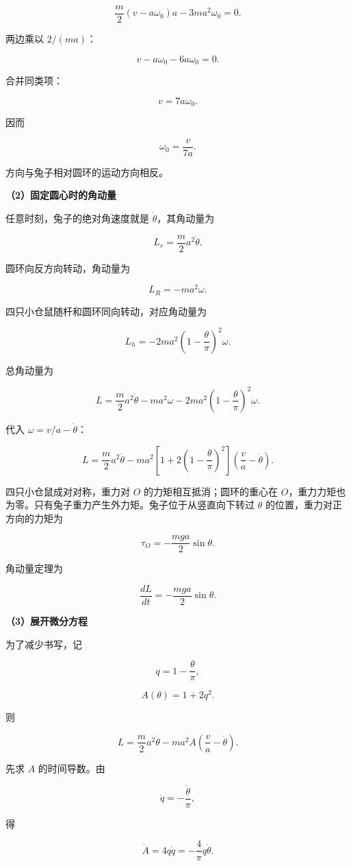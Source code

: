 \documentclass[12pt,a4paper,UTF8]{ctexart}
\begin{document}
\[\frac m2(v-a\omega_0)a-3ma^2\omega_0=0.\]

两边乘以 \(2/(ma)\)：

\[v-a\omega_0-6a\omega_0=0.\]

合并同类项：

\[v=7a\omega_0.\]

因而

\[\boxed{\omega_0=\frac{v}{7a}}.\]

方向与兔子相对圆环的运动方向相反。

\textbf{（2）固定圆心时的角动量}

任意时刻，兔子的绝对角速度就是 \(\dot\theta\)，其角动量为

\[L_r=\frac m2a^2\dot\theta.\]

圆环向反方向转动，角动量为

\[L_R=-ma^2\omega.\]

四只小仓鼠随杆和圆环同向转动，对应角动量为

\[L_h=-2ma^2\left(1-\frac\theta\pi\right)^2\omega.\]

总角动量为

\[L=\frac m2a^2\dot\theta
-ma^2\omega
-2ma^2\left(1-\frac\theta\pi\right)^2\omega.\]

代入 \(\omega=v/a-\dot\theta\)：

\[L=\frac m2a^2\dot\theta
-ma^2\left[1+2\left(1-\frac\theta\pi\right)^2\right]
\left(\frac va-\dot\theta\right).\]

四只小仓鼠成对对称，重力对 \(O\) 的力矩相互抵消；圆环的重心在
\(O\)，重力力矩也为零。只有兔子重力产生外力矩。兔子位于从竖直向下转过
\(\theta\) 的位置，重力对正方向的力矩为

\[\tau_O=-\frac{mga}{2}\sin\theta.\]

角动量定理为

\[\frac{dL}{dt}=-\frac{mga}{2}\sin\theta.\]

\textbf{（3）展开微分方程}

为了减少书写，记

\[q=1-\frac\theta\pi,\]

\[A(\theta)=1+2q^2.\]

则

\[L=\frac m2a^2\dot\theta-ma^2A
\left(\frac va-\dot\theta\right).\]

先求 \(A\) 的时间导数。由

\[\dot q=-\frac{\dot\theta}{\pi},\]

得

\[\dot A=4q\dot q
=-\frac4\pi q\dot\theta.\]
\end{document}
